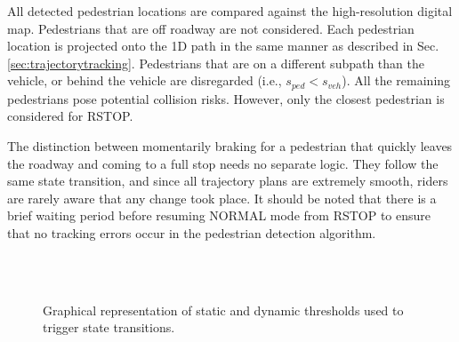 \documentclass[letterpaper, 10 pt, conference]{ieeeconf}  %
\begin{document}
All detected pedestrian locations are compared against the high-resolution digital map. Pedestrians that are off roadway are not considered.
Each pedestrian location is projected onto the 1D path in the same manner as described in Sec. \ref{sec:trajectorytracking}.
Pedestrians that are on a different subpath than the vehicle, or behind the vehicle are disregarded (i.e., $s_{ped} < s_{veh}$).
All the remaining pedestrians pose potential collision risks. However, only the closest pedestrian is considered for RSTOP.

The distinction between momentarily braking for a pedestrian that quickly leaves the roadway and coming to a full stop needs no separate logic.
They follow the same state transition, and since all trajectory plans are extremely smooth, riders are rarely aware that any change took place.
It should be noted that there is a brief waiting period before resuming NORMAL mode from RSTOP to ensure that no tracking errors occur in the pedestrian detection algorithm.

\begin{figure}[tb]
\centering
  \\
  \\
  \caption{Graphical representation of static and dynamic thresholds used to trigger state transitions.}
  \label{fig:react}
\end{figure}
\end{document}
